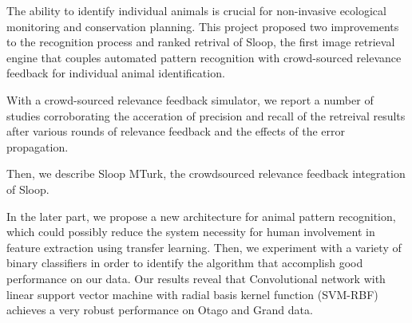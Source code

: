 %
%
%



The ability to identify individual animals is crucial for non-invasive
ecological monitoring and conservation planning. This project proposed two
improvements to the recognition process and ranked retrival of Sloop, the first
image retrieval engine that couples automated pattern recognition with
crowd-sourced relevance feedback for individual animal identification.

With a crowd-sourced relevance feedback simulator, we report a number of
studies corroborating the acceration of precision and recall of the retreival
results after various rounds of relevance feedback and the effects of the error
propagation.

Then, we describe Sloop MTurk, the crowdsourced relevance feedback integration
of Sloop.

In the later part, we propose a new architecture for animal pattern
recognition, which could possibly reduce the system necessity for human
involvement in feature extraction using transfer learning. Then, we experiment
with a variety of binary classifiers in order to identify the algorithm that
accomplish good performance on our data. Our results reveal that Convolutional
network with linear support vector machine with radial basis kernel function
(SVM-RBF) achieves a very robust performance on Otago and Grand data.


